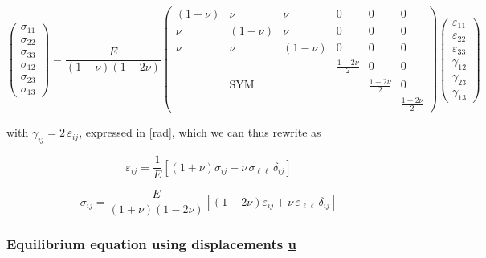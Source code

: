 \documentclass[12pt]{article}
\begin{document}
\begin{equation}
    \begin{pmatrix}
    \sigma_{11} \\
    \sigma_{22} \\
    \sigma_{33} \\
    \sigma_{12} \\
    \sigma_{23} \\
    \sigma_{13}
    \end{pmatrix}= \frac{E}{(1+\nu)(1-2\nu)}\begin{pmatrix}
    (1-\nu) &  \nu & \nu & 0 & 0 & 0 \\
    \nu & (1-\nu) & \nu & 0 & 0 & 0 \\
    \nu & \nu & (1-\nu) & 0 & 0 & 0 \\
     &  &  & \frac{1-2\nu }{2} & 0 & 0 \\
     &  \text{SYM}&  &  & \frac{1-2\nu }{2} & 0 \\
     &  &  &  &  & \frac{1-2\nu }{2}
    \end{pmatrix}
    \begin{pmatrix}
    \varepsilon_{11} \\
    \varepsilon_{22} \\
    \varepsilon_{33} \\
    \gamma_{12} \\
    \gamma_{23} \\
    \gamma_{13}
    \end{pmatrix}
    \label{eqn: SoM simplified stress-strain, matrix form}
\end{equation}

with $\gamma_{ij} = 2 \, \varepsilon_{ij}$, expressed in [rad], which we can thus rewrite as 

\begin{equation}
    \varepsilon_{ij} = \frac{1}{E} \left[ (1+\nu) \sigma_{ij} - \nu \, \sigma_{\ell \ell} \, \delta_{ij} \right]
    \label{eqn: SoM simplified strain-stress, index form}
\end{equation}

\begin{equation}
    \sigma_{ij} = \frac{E}{(1+\nu)(1-2\nu)} \left[ (1 - 2\nu) \varepsilon_{ij} + \nu \, \varepsilon_{\ell \ell} \, \delta_{ij} \right]
    \label{eqn: SoM simplified stress-strain, index form}
\end{equation}

\subsubsection{Equilibrium equation using displacements \underline{\textbf{u}}}
\end{document}
